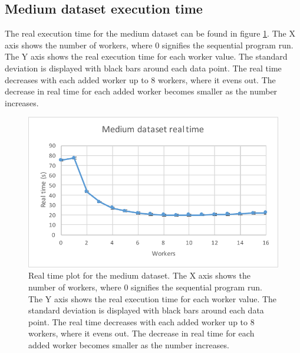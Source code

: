 \subsection{Medium dataset execution time}
The real execution time for the medium dataset can be found in figure \ref{fig:dataset_3_real_time}.
The X axis shows the number of workers, where 0 signifies the sequential program run.
The Y axis shows the real execution time for each worker value. The standard deviation is displayed with black bars around each data point. The real time
decreases with each added worker up to 8 workers, where it evens out. The decrease in real time for each added worker becomes smaller as the number increases.
\begin{figure}[ht]
  \centering
  \includegraphics[width=120mm]{figures/dataset_3/dataset_3_real_time.pdf}
  \caption[Real time plot for the medium dataset.]{Real time plot for the medium dataset. The X axis shows the number of workers, where 0 signifies the sequential program run.
  The Y axis shows the real execution time for each worker value. The standard deviation is displayed with black bars around each data point. The real time
  decreases with each added worker up to 8 workers, where it evens out. The decrease in real time for each added worker becomes smaller as the number increases.}
  \label{fig:dataset_3_real_time}
\end{figure}

